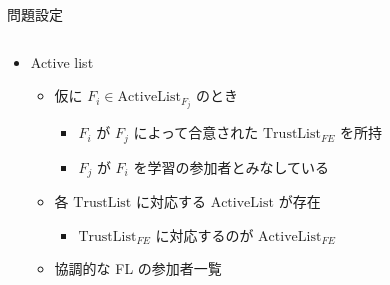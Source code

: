 \documentclass[unicode,12pt,aspectratio=169, dvipdfmx]{beamer}
\begin{document}
    \begin{frame}{問題設定}
        \begin{columns}
            \begin{column}[T]{.7\linewidth}
                \begin{itemize}
                  \item Active list
                    \begin{itemize}
                      \item 仮に $F_i \in \mathrm{ActiveList}_{F_j}$ のとき
                        \begin{itemize}
                          \item $F_i$ が $F_j$ によって合意された $\mathrm{TrustList}_{FE}$ を所持
                          \item $F_j$ が $F_i$ を学習の参加者とみなしている
                        \end{itemize}
                      \item 各 $\mathrm{TrustList}$ に対応する $\mathrm{ActiveList}$ が存在
                        \begin{itemize}
                          \item $\mathrm{TrustList}_{FE}$ に対応するのが $\mathrm{ActiveList}_{FE}$
                        \end{itemize}
                      \item 協調的な FL の参加者一覧
                    \end{itemize}               
                 \end{itemize}
            \end{column}
        \end{columns}
    \end{frame}
\end{document}
